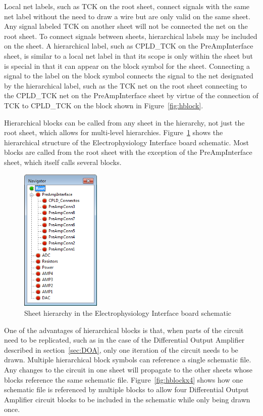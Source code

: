 Local net labels, such as TCK on the root sheet, connect signals with the same net label without the need to draw a wire but are only valid on the same sheet.  Any signal labeled TCK on another sheet will not be connected the net on the root sheet.  To connect signals between sheets, hierarchical labels may be included on the sheet.  A hierarchical label, such as CPLD\_TCK on the PreAmpInterface sheet, is similar to a local net label in that its scope is only within the sheet but is special in that it can appear on the block symbol for the sheet.  Connecting a signal to the label on the block symbol connects the signal to the net designated by the hierarchical label, such as the TCK net on the root sheet connecting to the CPLD\_TCK net on the PreAmpInterface sheet by virtue of the connection of TCK to CPLD\_TCK on the block shown in Figure~\ref{fig:hblock}.

Hierarchical blocks can be called from any sheet in the hierarchy, not just the root sheet, which allows for multi-level hierarchies.  Figure~\ref{fig:hierarchy} shows the hierarchical structure of the Electrophysiology Interface board schematic.  Most blocks are called from the root sheet with the exception of the PreAmpInterface sheet, which itself calls several blocks.

\begin{figure}[h]
	\begin{singlespace}
	\centering
	\includegraphics[width=1.5in]{./figures/Hierarchy}
	\caption{Sheet hierarchy in the Electrophysiology Interface board schematic \label{fig:hierarchy}}
	\end{singlespace}
\end{figure}

One of the advantages of hierarchical blocks is that, when parts of the circuit need to be replicated, such as in the case of the Differential Output Amplifier described in section~\ref{sec:DOA}, only one iteration of the circuit needs to be drawn.  Multiple hierarchical block symbols can reference a single schematic file.  Any changes to the circuit in one sheet will propagate to the other sheets whose blocks reference the same schematic file.  Figure~\ref{fig:hblockx4} shows how one schematic file is referenced by multiple blocks to allow four Differential Output Amplifier circuit blocks to be included in the schematic while only being drawn once.

